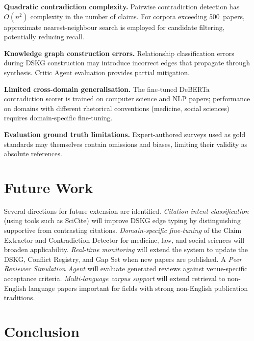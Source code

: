 \documentclass{llncs}
\begin{document}
\textbf{Quadratic contradiction complexity.}
Pairwise contradiction detection has $O(n^2)$ complexity in the number of
claims. For corpora exceeding 500~papers, approximate nearest-neighbour search
is employed for candidate filtering, potentially reducing recall.

\textbf{Knowledge graph construction errors.}
Relationship classification errors during DSKG construction may introduce
incorrect edges that propagate through synthesis. Critic Agent evaluation
provides partial mitigation.

\textbf{Limited cross-domain generalisation.}
The fine-tuned DeBERTa contradiction scorer is trained on computer science
and NLP papers; performance on domains with different rhetorical conventions
(medicine, social sciences) requires domain-specific fine-tuning.

\textbf{Evaluation ground truth limitations.}
Expert-authored surveys used as gold standards may themselves contain
omissions and biases, limiting their validity as absolute references.

\section{Future Work}
\label{sec:future}

Several directions for future extension are identified. \textit{Citation intent
classification} (using tools such as SciCite) will improve DSKG edge typing by
distinguishing supportive from contrasting citations. \textit{Domain-specific
fine-tuning} of the Claim Extractor and Contradiction Detector for medicine,
law, and social sciences will broaden applicability. \textit{Real-time
monitoring} will extend the system to update the DSKG, Conflict Registry, and
Gap Set when new papers are published. A \textit{Peer Reviewer Simulation Agent}
will evaluate generated reviews against venue-specific acceptance criteria.
\textit{Multi-language corpus support} will extend retrieval to non-English
language papers important for fields with strong non-English publication
traditions.

\section{Conclusion}
\label{sec:conclusion}
\end{document}
